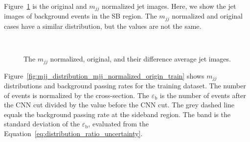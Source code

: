 \documentclass[12pt]{article}
\begin{document}
			Figure~\ref{fig:average_jet_image_origin_mjj_normalized_difference} is the original and $m_{jj}$ normalized jet images. Here, we show the jet images of background events in the SB region. The $m_{jj}$ normalized and original cases have a similar distribution, but the values are not the same.
			\begin{figure}[htpb]
				\centering
				 \\ 
				\caption{The $m_{jj}$ normalized, original, and their difference average jet images.}
				\label{fig:average_jet_image_origin_mjj_normalized_difference}
			\end{figure}

			Figure~\ref{fig:mjj_distribution_mjj_normalized_origin_train} shows $m_{jj}$ distributions and background passing rates for the training dataset. The number of events is normalized by the cross-section. The $\varepsilon_{\text{b}}$ is the number of events after the CNN cut divided by the value before the CNN cut. The grey dashed line equals the background passing rate at the sideband region. The band is the standard deviation of the $\varepsilon_{\text{b}}$, evaluated from the Equation~\ref{eq:distribution_ratio_uncertainty}.
\end{document}
